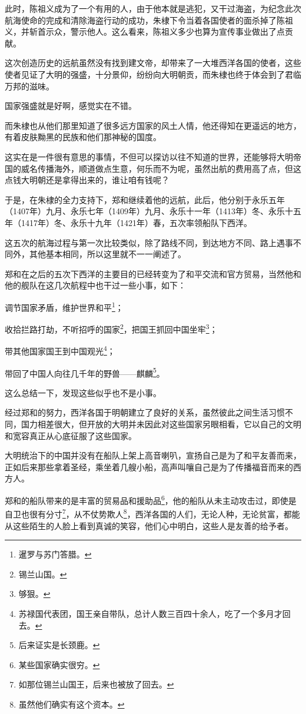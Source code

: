 \begin{multicols}{\theparacolNo}
此时，陈祖义成为了一个有用的人，由于他本就是逃犯，又干过海盗，为纪念此次航海使命的完成和清除海盗行动的成功，朱棣下令当着各国使者的面杀掉了陈祖义，并斩首示众，警示他人。这么看来，陈祖义多少也算为宣传事业做出了点贡献。

这次创造历史的远航虽然没有找到建文帝，却带来了一大堆西洋各国的使者，这些使者见证了大明的强盛，十分景仰，纷纷向大明朝贡，而朱棣也终于体会到了君临万邦的滋味。

国家强盛就是好啊，感觉实在不错。

而朱棣也从他们那里知道了很多远方国家的风土人情，他还得知在更遥远的地方，有着皮肤黝黑的民族和他们那神秘的国度。

这实在是一件很有意思的事情，不但可以探访以往不知道的世界，还能够将大明帝国的威名传播海外，顺道做点生意，何乐而不为呢，虽然出航的费用高了点，但这点钱大明朝还是拿得出来的，谁让咱有钱呢？

于是，在朱棣的全力支持下，郑和继续着他的远航，此后，他分别于永乐五年（1407年）九月、永乐七年（1409年）九月、永乐十一年（1413年）冬、永乐十五年（1417年）冬、永乐十九年（1421年）春，五次率领船队下西洋。

这五次的航海过程与第一次比较类似，除了路线不同，到达地方不同、路上遇事不同外，其他基本相同，所以这里就不一一阐述了。

郑和在之后的五次下西洋的主要目的已经转变为了和平交流和官方贸易，当然他和他的舰队在这几次航程中也干过一些小事，如下：

调节国家矛盾，维护世界和平\footnote{暹罗与苏门答腊。}；

收拾拦路打劫，不听招呼的国家\footnote{锡兰山国。}，把国王抓回中国坐牢\footnote{够狠。}；

带其他国家国王到中国观光\footnote{苏禄国代表团，国王亲自带队，总计人数三百四十余人，吃了一个多月才回去。}；

带回了中国人向往几千年的野兽——麒麟\footnote{后来证实是长颈鹿。}。

这么总结一下，发现这些似乎也不是小事。

经过郑和的努力，西洋各国于明朝建立了良好的关系，虽然彼此之间生活习惯不同，国力相差很大，但开放的大明并未因此对这些国家另眼相看，它以自己的文明和宽容真正从心底征服了这些国家。

大明统治下的中国并没有在船队上架上高音喇叭，宣扬自己是为了和平友善而来，正如后来那些拿着圣经，乘坐着几艘小船，高声叫嚷自己是为了传播福音而来的西方人。

郑和的船队带来的是丰富的贸易品和援助品\footnote{某些国家确实很穷。}，他的船队从未主动攻击过，即使是自卫也很有分寸\footnote{如那位锡兰山国王，后来也被放了回去。}，从不仗势欺人\footnote{虽然他们确实有这个资本。}，西洋各国的人们，无论人种，无论贫富，都能从这些陌生的人脸上看到真诚的笑容，他们心中明白，这些人是友善的给予者。


\end{multicols}
